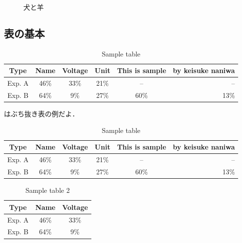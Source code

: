 \documentclass[platex,dvipdfmx]{jlreq}%
\numberwithin{equation}{section}%
\begin{document}
\begin{figure}[tb]
\begin{minipage}[b]{.5\columnwidth}
  \label{fig:gorilla}
 \end{minipage}
 \caption{犬と羊}\label{fig:animals}
\end{figure}

\subsection{表の基本}

\begin{table}[tb]
  \caption{Sample table}
   \label{table:test}
   \centering
   \begin{tabular}{cccccr}\hline
    Type & Name & Voltage & Unit & This is sample & by keisuke naniwa\\ \hline \hline
   Exp. A & 46\%& 33\%& 21\%& --& --\\ 
   Exp. B & 64\%& 9\%& 27\%& 60\%& 13\%\\ \hline    
   \end{tabular}
\end{table}
\fi%

はぶち抜き表の例だよ．

\begin{table}[t!!]
  \caption{Sample table}
   \label{tab:test}
   \centering
   \begin{tabular}{cccccr}\hline
    Type & Name & Voltage & Unit & This is sample & by keisuke naniwa\\ \hline \hline
   Exp. A & 46\%& 33\%& 21\%& --& --\\ 
   Exp. B & 64\%& 9\%& 27\%& 60\%& 13\%\\ \hline    
   \end{tabular}
\end{table}

\begin{table}[tb]
  \caption{Sample table 2}
   \label{table:test2}
   \centering
   \begin{tabular}{ccc}\hline
    Type & Name & Voltage \\ \hline \hline
   Exp. A & 46\%& 33\% \\ 
   Exp. B & 64\%& 9\% \\ \hline    
   \end{tabular}
\end{table}
\end{document}
